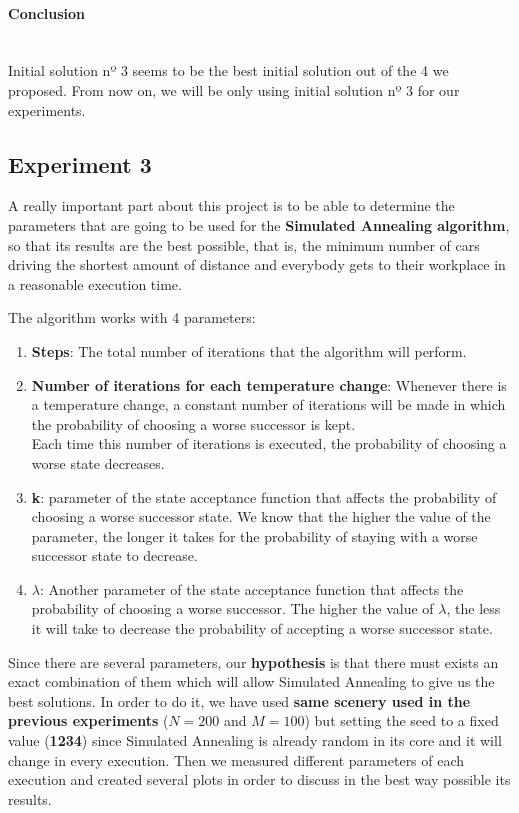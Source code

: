 \documentclass[12]{article}
\begin{document}
\paragraph{Conclusion}\mbox{}\\
Initial solution nº 3 seems to be the best initial solution out of the 4 we proposed.
From now on, we will be only using initial solution nº 3 for our experiments.

\subsection{Experiment 3}

A really important part about this project is to be able to determine the parameters that are going to be used for the \textbf{Simulated Annealing algorithm}, so that its results are the best possible, that is, the minimum number of cars driving the shortest amount of distance and everybody gets to their workplace in a reasonable execution time. 
\\
\medskip

The algorithm works with 4 parameters:
\begin{enumerate}
\item \textbf{Steps}: The total number of iterations that the algorithm will perform. 
\item \textbf{Number of iterations for each temperature change}: Whenever there is a temperature change, a constant number of iterations will be made in which the probability of choosing a worse successor is kept. 
\\
Each time this number of iterations is executed, the probability of choosing a worse state decreases. 
\item \textbf{k}: parameter of the state acceptance function that affects the probability of choosing a worse successor state. We know that the higher the value of the parameter, the longer it takes for the probability of staying with a worse successor state to decrease. 

\item \textbf{$\lambda$}: Another parameter of the state acceptance function that affects the probability of choosing a worse successor. The higher the value of $\lambda$, the less it will take to decrease the probability of accepting a worse successor state. 


\end{enumerate}


Since there are several parameters, our \textbf{hypothesis} is that there must exists an exact combination of them which will allow Simulated Annealing to give us the best solutions. In order to do it, we have used \textbf{same scenery used in the previous experiments} ($N=200$ and $M=100$) but setting the seed to a fixed value (\textbf{1234}) since Simulated Annealing is already random in its core and it will change in every execution. Then we measured different parameters of each execution and created several plots in order to discuss in the best way possible its results. 
\end{document}
